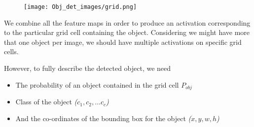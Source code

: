 \begin{figure}[h!]
    \centering
    \texttt{[image: Obj\_det\_images/grid.png]}
    \caption{\cite{JJ1}}
    \label{Grid}
\end{figure}








\newpage

We combine all the feature maps in order to produce an activation corresponding to the particular grid cell containing the object. Considering we might have more that one object per image, we should have multiple activations on specific grid cells. 

\par

However, to fully describe the detected object, we need

\begin{itemize}
    
    \item The probability of an object contained in the grid cell \textit{$P_{obj}$}
    
    \item Class of the object \textit{($c_{1}, c_{2},...c_{c}$)}
    
    \item And the co-ordinates of the bounding box for the object \textit{($x,y,w,h$)}
    
\end{itemize}

